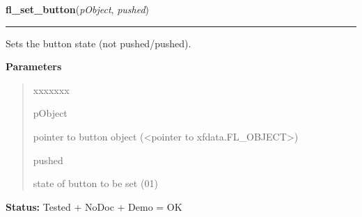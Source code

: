\hspace{.8\funcindent}\begin{boxedminipage}{\funcwidth}

    \raggedright \textbf{fl\_set\_button}(\textit{pObject}, \textit{pushed})

    \vspace{-1.5ex}

    \rule{\textwidth}{0.5\fboxrule}
\setlength{\parskip}{2ex}
    Sets the button state (not pushed/pushed).

\setlength{\parskip}{1ex}
      \textbf{Parameters}
      \vspace{-1ex}

      \begin{quote}
        \begin{Ventry}{xxxxxxx}

          \item[pObject]

          pointer to button object ({\textless}pointer to 
          xfdata.FL\_OBJECT{\textgreater})

          \item[pushed]

          state of button to be set (0{\textbar}1)

        \end{Ventry}

      \end{quote}

\textbf{Status:} Tested + NoDoc + Demo = OK



    \end{boxedminipage}

    \label{xformslib:library:fl_get_button_numb}

    \vspace{0.5ex}

